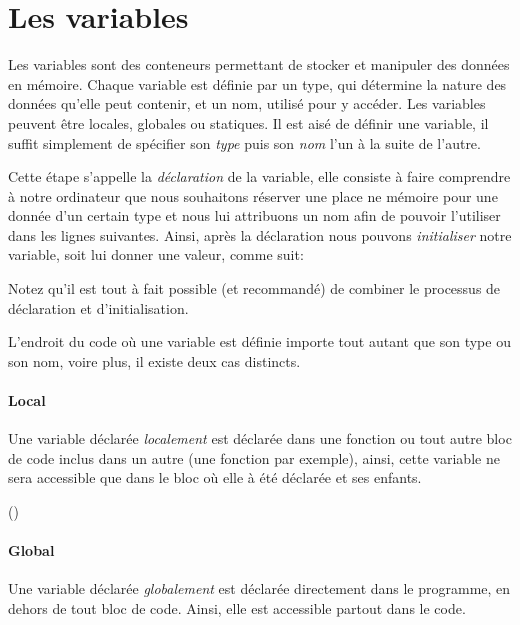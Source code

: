 \section{Les variables}
Les variables sont des conteneurs permettant de stocker et manipuler des données en mémoire. Chaque variable est définie par un type, qui détermine la nature des données qu’elle peut contenir, et un nom, utilisé pour y accéder. Les variables peuvent être locales, globales ou statiques. Il est aisé de définir une variable, il suffit simplement de spécifier son \emph{type} puis son \emph{nom} l'un à la suite de l'autre.



Cette étape s'appelle la \emph{déclaration} de la variable, elle consiste à faire comprendre à notre ordinateur que nous souhaitons réserver une place ne mémoire pour une donnée d'un certain type et nous lui attribuons un nom afin de pouvoir l'utiliser dans les lignes suivantes. Ainsi, après la déclaration nous pouvons \emph{initialiser} notre variable, soit lui donner une valeur, comme suit:



Notez qu'il est tout à fait possible (et recommandé) de combiner le processus de déclaration et d'initialisation.



L'endroit du code où une variable est définie importe tout autant que son type ou son nom, voire plus, il existe deux cas distincts.

\paragraph{Local}
Une variable déclarée \emph{localement} est déclarée dans une fonction ou tout autre bloc de code inclus dans un autre (une fonction par exemple), ainsi, cette variable ne sera accessible que dans le bloc où elle à été déclarée et ses enfants.


()

\paragraph{Global}
Une variable déclarée \emph{globalement} est déclarée directement dans le programme, en dehors de tout bloc de code. Ainsi, elle est accessible partout dans le code.

